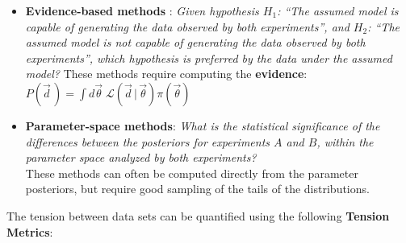 \begin{itemize}
    \item \textbf{Evidence-based methods} :
    \emph{Given hypothesis $H_1$: ``The assumed model is capable of generating the data observed by both experiments'', and $H_2$: ``The assumed model is not capable of generating the data observed by both experiments'', which hypothesis is preferred by the data under the assumed model?} These methods require computing the \textbf{evidence}: $P(\vec{d}\,) = \int d\vec{\theta}\; \mathcal{L}(\vec{d}\,|\,\vec{\theta}) \pi(\vec{\theta})$
    \item \textbf{Parameter-space methods}: 
    \emph{What is the statistical significance of the differences between the posteriors for experiments $A$ and $B$, within the parameter space analyzed by both experiments?} \\
    These methods can often be computed directly from the parameter posteriors, but require good sampling of the tails of the distributions.
\end{itemize}

The tension between data sets can be quantified using the following \textbf{Tension Metrics}:

